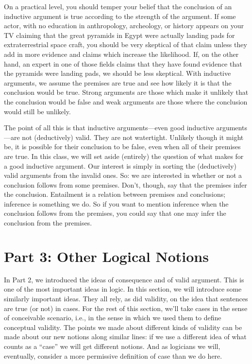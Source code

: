 On a practical level, you should temper your belief that the conclusion of an inductive argument is true according to the strength of the argument. If some actor, with no education in anthropology, archeology, or history appears on your TV claiming that the great pyramids in Egypt were actually landing pads for extraterrestrial space craft, you should be very skeptical of that claim unless they add in more evidence and claims which increase the likelihood. If, on the other hand, an expert in one of those fields claims that they have found evidence that the pyramids were landing pads, we should be less skeptical. With inductive arguments, we assume the premises are true and see how likely it is that the conclusion would be true. Strong arguments are those which make it unlikely that the conclusion would be false and weak arguments are those where the conclusion would still be unlikely.  

The point of all this is that inductive arguments—even good inductive arguments—are not (deductively) valid. They are not watertight. Unlikely though it might be, it is possible for their conclusion to be false, even when all of their premises are true. In this class, we will set aside (entirely) the question of what makes for a good inductive argument. Our interest is simply in sorting the (deductively) valid arguments from the invalid ones. So: we are interested in whether or not a conclusion follows from some premises. Don’t, though, say that the premises infer the conclusion. Entailment is a relation between premises and conclusions; inference is something we do. So if you want to mention inference when the conclusion follows from the premises, you could say that one may infer the conclusion from the premises.

\turing

\chapter{Part 3: Other Logical Notions}
In Part 2, we introduced the ideas of consequence and of valid argument. This is one of the most important ideas in logic. In this section, we will introduce some similarly important ideas. They all rely, as did validity, on the idea that sentences are true (or not) in cases. For the rest of this section, we’ll take cases in the sense of conceivable scenario, i.e., in the sense in which we used them to define conceptual validity. The points we made about different kinds of validity can be made about our new notions along similar lines: if we use a different idea of what counts as a “case” we will get different notions. And as logicians we will, eventually, consider a more permissive definition of case than we do here.
